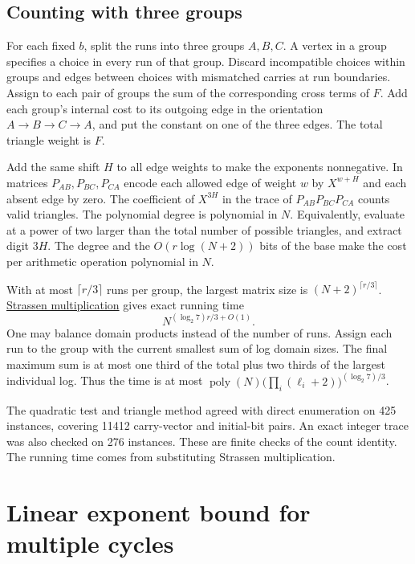 \documentclass[11pt,a4paper]{article}
\numberwithin{equation}{section}
\begin{document}
\subsection{Counting with three groups}\label{counting-with-three-groups}

For each fixed \(b\), split the runs into three groups \(A,B,C\). A vertex in a group specifies a choice in every run of that group. Discard incompatible choices within groups and edges between choices with mismatched carries at run boundaries. Assign to each pair of groups the sum of the corresponding cross terms of \(F\). Add each group's internal cost to its outgoing edge in the orientation \(A\to B\to C\to A\), and put the constant on one of the three edges. The total triangle weight is \(F\).

Add the same shift \(H\) to all edge weights to make the exponents nonnegative. In matrices \(P_{AB},P_{BC},P_{CA}\) encode each allowed edge of weight \(w\) by \(X^{w+H}\) and each absent edge by zero. The coefficient of \(X^{3H}\) in the trace of \(P_{AB}P_{BC}P_{CA}\) counts valid triangles. The polynomial degree is polynomial in \(N\). Equivalently, evaluate at a power of two larger than the total number of possible triangles, and extract digit \(3H\). The degree and the \(O(r\log(N+2))\) bits of the base make the cost per arithmetic operation polynomial in \(N\).

With at most \(\lceil r/3\rceil\) runs per group, the largest matrix size is \((N+2)^{\lceil r/3\rceil}\). \href{https://deltadbu.github.io/UCAS_algorithm_course/Lectures/Lec5-Matrix-Multiplication-Strassen1969.pdf}{Strassen multiplication} gives exact running time
\begin{equation}\label{eq:three-group-time}
N^{(\log_2 7)r/3+O(1)}.
\end{equation}
One may balance domain products instead of the number of runs. Assign each run to the group with the current smallest sum of log domain sizes. The final maximum sum is at most one third of the total plus two thirds of the largest individual log. Thus the time is at most \(\operatorname{poly}(N)\bigl(\prod_i(\ell_i+2)\bigr)^{(\log_2 7)/3}\).

The quadratic test and triangle method agreed with direct enumeration on 425 instances, covering 11412 carry-vector and initial-bit pairs. An exact integer trace was also checked on 276 instances. These are finite checks of the count identity. The running time comes from substituting Strassen multiplication.

\section{Linear exponent bound for multiple cycles}\label{linear-exponent-bound-for-multiple-cycles}
\end{document}
